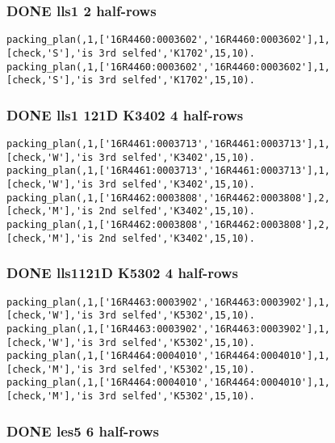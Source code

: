 \documentclass[11pt]{article}
\begin{document}
\subsubsection{{\bfseries\sffamily DONE} lls1 2 half-rows}
\label{sec-4-4-1}

\begin{verbatim}
packing_plan(,1,['16R4460:0003602','16R4460:0003602'],1,[check,'S'],'is 3rd selfed','K1702',15,10).
packing_plan(,1,['16R4460:0003602','16R4460:0003602'],1,[check,'S'],'is 3rd selfed','K1702',15,10).
\end{verbatim}



\subsubsection{{\bfseries\sffamily DONE} lls1 121D K3402 4 half-rows}
\label{sec-4-4-2}

\begin{verbatim}
packing_plan(,1,['16R4461:0003713','16R4461:0003713'],1,[check,'W'],'is 3rd selfed','K3402',15,10).
packing_plan(,1,['16R4461:0003713','16R4461:0003713'],1,[check,'W'],'is 3rd selfed','K3402',15,10).
packing_plan(,1,['16R4462:0003808','16R4462:0003808'],2,[check,'M'],'is 2nd selfed','K3402',15,10).
packing_plan(,1,['16R4462:0003808','16R4462:0003808'],2,[check,'M'],'is 2nd selfed','K3402',15,10).
\end{verbatim}



\subsubsection{{\bfseries\sffamily DONE} lls1121D K5302 4 half-rows}
\label{sec-4-4-3}

\begin{verbatim}
packing_plan(,1,['16R4463:0003902','16R4463:0003902'],1,[check,'W'],'is 3rd selfed','K5302',15,10).
packing_plan(,1,['16R4463:0003902','16R4463:0003902'],1,[check,'W'],'is 3rd selfed','K5302',15,10).
packing_plan(,1,['16R4464:0004010','16R4464:0004010'],1,[check,'M'],'is 3rd selfed','K5302',15,10).
packing_plan(,1,['16R4464:0004010','16R4464:0004010'],1,[check,'M'],'is 3rd selfed','K5302',15,10).
\end{verbatim}







\subsubsection{{\bfseries\sffamily DONE} les5 6 half-rows}
\label{sec-4-4-4}
\end{document}
